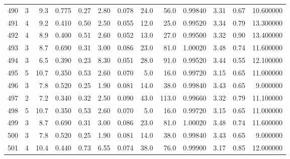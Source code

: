 \begin{tabular}{lrrrrrrrrrrrr}
490  &        3 &            9.3 &             0.775 &         0.27 &            2.80 &      0.078 &                 24.0 &                  56.0 &  0.99840 &  3.31 &       0.67 &  10.600000 \\
491  &        4 &            9.2 &             0.410 &         0.50 &            2.50 &      0.055 &                 12.0 &                  25.0 &  0.99520 &  3.34 &       0.79 &  13.300000 \\
492  &        4 &            8.9 &             0.400 &         0.51 &            2.60 &      0.052 &                 13.0 &                  27.0 &  0.99500 &  3.32 &       0.90 &  13.400000 \\
493  &        3 &            8.7 &             0.690 &         0.31 &            3.00 &      0.086 &                 23.0 &                  81.0 &  1.00020 &  3.48 &       0.74 &  11.600000 \\
494  &        3 &            6.5 &             0.390 &         0.23 &            8.30 &      0.051 &                 28.0 &                  91.0 &  0.99520 &  3.44 &       0.55 &  12.100000 \\
495  &        5 &           10.7 &             0.350 &         0.53 &            2.60 &      0.070 &                  5.0 &                  16.0 &  0.99720 &  3.15 &       0.65 &  11.000000 \\
496  &        3 &            7.8 &             0.520 &         0.25 &            1.90 &      0.081 &                 14.0 &                  38.0 &  0.99840 &  3.43 &       0.65 &   9.000000 \\
497  &        2 &            7.2 &             0.340 &         0.32 &            2.50 &      0.090 &                 43.0 &                 113.0 &  0.99660 &  3.32 &       0.79 &  11.100000 \\
498  &        5 &           10.7 &             0.350 &         0.53 &            2.60 &      0.070 &                  5.0 &                  16.0 &  0.99720 &  3.15 &       0.65 &  11.000000 \\
499  &        3 &            8.7 &             0.690 &         0.31 &            3.00 &      0.086 &                 23.0 &                  81.0 &  1.00020 &  3.48 &       0.74 &  11.600000 \\
500  &        3 &            7.8 &             0.520 &         0.25 &            1.90 &      0.081 &                 14.0 &                  38.0 &  0.99840 &  3.43 &       0.65 &   9.000000 \\
501  &        4 &           10.4 &             0.440 &         0.73 &            6.55 &      0.074 &                 38.0 &                  76.0 &  0.99900 &  3.17 &       0.85 &  12.000000 \\

\end{tabular}
